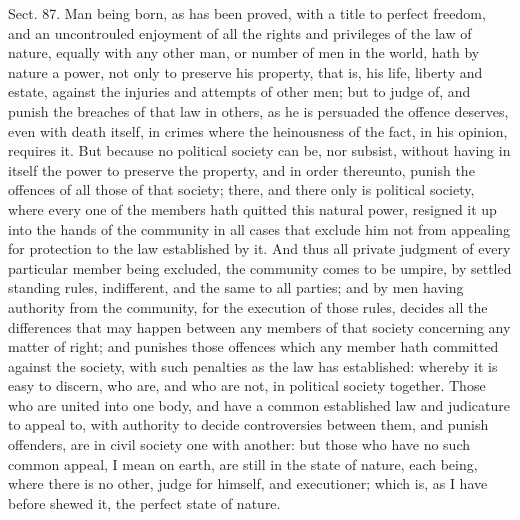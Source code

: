 \documentclass[11pt,openany]{book}
\begin{document}
Sect. 87. Man being born, as has been proved, with a title to perfect freedom, and an uncontrouled enjoyment of all the rights and privileges of the law of nature, equally with any other man, or number of men in the world, hath by nature a power, not only to preserve his property, that is, his life, liberty and estate, against the injuries and attempts of other men; but to judge of, and punish the breaches of that law in others, as he is persuaded the offence deserves, even with death itself, in crimes where the heinousness of the fact, in his opinion, requires it. But because no political society can be, nor subsist, without having in itself the power to preserve the property, and in order thereunto, punish the offences of all those of that society; there, and there only is political society, where every one of the members hath quitted this natural power, resigned it up into the hands of the community in all cases that exclude him not from appealing for protection to the law established by it. And thus all private judgment of every particular member being excluded, the community comes to be umpire, by settled standing rules, indifferent, and the same to all parties; and by men having authority from the community, for the execution of those rules, decides all the differences that may happen between any members of that society concerning any matter of right; and punishes those offences which any member hath committed against the society, with such penalties as the law has established: whereby it is easy to discern, who are, and who are not, in political society together. Those who are united into one body, and have a common established law and judicature to appeal to, with authority to decide controversies between them, and punish offenders, are in civil society one with another: but those who have no such common appeal, I mean on earth, are still in the state of nature, each being, where there is no other, judge for himself, and executioner; which is, as I have before shewed it, the perfect state of nature.
\end{document}
